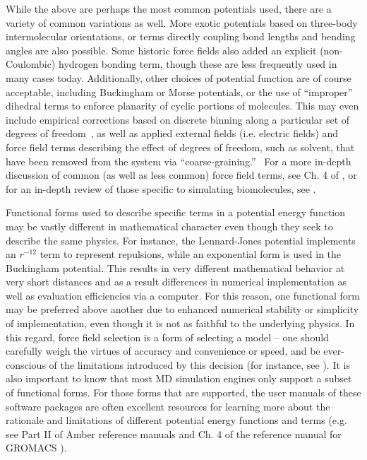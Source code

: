 \documentclass[9pt,bestpractices]{livecoms}
\begin{document}
While the above are perhaps the most common potentials used, there are a variety of common variations as well.
More exotic potentials based on three-body intermolecular orientations, or terms directly coupling bond lengths and bending angles are also possible.
Some historic force fields also added an explicit (non-Coulombic) hydrogen bonding term, though these are less frequently used in many cases today.
Additionally, other choices of potential function are of course acceptable, including Buckingham or Morse potentials, or the use of ``improper'' dihedral terms to enforce planarity of cyclic portions of molecules.
This may even include empirical corrections based on discrete binning along a particular set of degrees of freedom~\citep{mackerell2004CMAP, perez2015}, as well as applied external fields (i.e. electric fields) and force field terms describing the effect of degrees of freedom, such as solvent, that have been removed from the system via ``coarse-graining.''~\citep{sanyal2016}
For a more in-depth discussion of common (as well as less common) force field terms, see Ch. 4 of \citet{LeachBook}, or for an in-depth review of those specific to simulating biomolecules, see \citet{Ponder2003}.

Functional forms used to describe specific terms in a potential energy function may be vastly different in mathematical character even though they seek to describe the same physics.
For instance, the Lennard-Jones potential implements an $r^{-12}$ term to represent repulsions, while an exponential form is used in the Buckingham potential.
This results in very different mathematical behavior at very short distances and as a result differences in numerical implementation as well as evaluation efficiencies via a computer.
For this reason, one functional form may be preferred above another due to  enhanced numerical stability or simplicity of implementation, even though it is not as faithful to the underlying physics.
In this regard, force field selection is a form of selecting a model -- one should carefully weigh the virtues of accuracy and convenience or speed, and be ever-conscious of the limitations introduced by this decision (for instance, see \citet{Becker2013}).
It is also important to know that most MD simulation engines only support a subset of functional forms.
For those forms that are supported, the user manuals of these software packages are often excellent resources for learning more about the rationale and limitations of different potential energy functions and terms (e.g. see Part II of Amber reference manuals\citep{AmberManual} and Ch. 4 of the reference manual for GROMACS \citep{GROMACSManual}).
\end{document}
